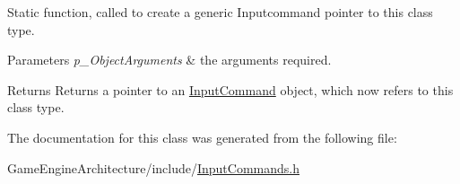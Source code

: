 Static function, called to create a generic Inputcommand pointer to this class type. 


\begin{DoxyParams}{Parameters}
{\em p\+\_\+\+Object\+Arguments} & the arguments required. \\
\hline
\end{DoxyParams}
\begin{DoxyReturn}{Returns}
Returns a pointer to an \mbox{\hyperlink{class_input_command}{Input\+Command}} object, which now refers to this class type. 
\end{DoxyReturn}


The documentation for this class was generated from the following file\+:\begin{DoxyCompactItemize}
\item 
Game\+Engine\+Architecture/include/\mbox{\hyperlink{_input_commands_8h}{Input\+Commands.\+h}}\end{DoxyCompactItemize}
